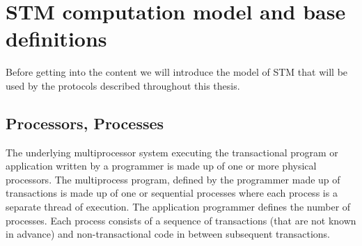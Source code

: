 















































\section{STM computation model and base definitions}
\label{sec:model-and-conditions}



Before getting into the content we will introduce the model of STM that will be used
by the protocols described throughout this thesis.

\subsection{Processors, Processes}
The underlying multiprocessor system executing the transactional program or application
written by a programmer is made up of one or more physical processors.
The multiprocess program, defined  by the  programmer made up of transactions is  made up  of one or
sequential processes  where each process is a separate thread of execution.
The application programmer defines the number of processes.
Each process consists of  a sequence of 
transactions (that are not known in advance) and non-transactional code
in between subsequent transactions.






